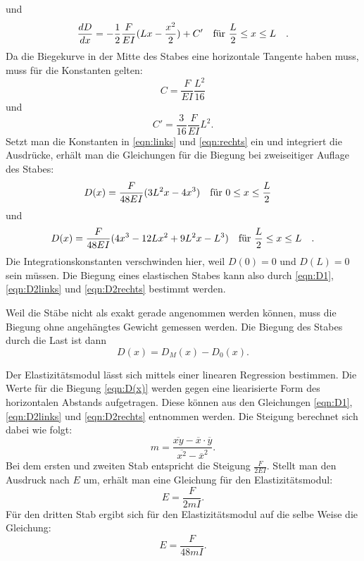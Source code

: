 und
\begin{equation*}
\frac{dD}{dx} = - \frac{1}{2} \frac{F}{EI} (Lx-\frac{x^2}{2}) + C' \qq{für $\frac{L}{2} \leq x \leq L$}.
\end{equation*}
Da die Biegekurve in der Mitte des Stabes eine horizontale Tangente
haben muss, muss für die Konstanten gelten:
\begin{equation*}
C = \frac{F}{EI} \frac{L^2}{16}
\end{equation*}
und
\begin{equation*}
C' = \frac{3}{16} \frac{F}{EI} L^2.
\end{equation*}
Setzt man die Konstanten in \eqref{eqn:links} und \eqref{eqn:rechts}
ein und integriert die Ausdrücke, erhält man die Gleichungen
für die Biegung bei zweiseitiger Auflage des Stabes:
\begin{equation}
D(x) = \frac{F}{48EI} (3L^2x - 4x^3) \qq{für $0 \leq x \leq \frac{L}{2}$}
\label{eqn:D2links}
\end{equation}
und
\begin{equation}
D(x) = \frac{F}{48EI} (4x^3 - 12Lx^2 + 9L^2x - L^3) \qq{für $\frac{L}{2} \leq x \leq L$}.
\label{eqn:D2rechts}
\end{equation}
Die Integrationskonstanten verschwinden hier, weil $D(0) = 0$ und $D(L) = 0$ sein müssen.
Die Biegung eines elastischen Stabes kann also durch
\eqref{eqn:D1}, \eqref{eqn:D2links} und \eqref{eqn:D2rechts} bestimmt werden.

\noindent Weil die Stäbe nicht als exakt gerade angenommen werden können,
muss die Biegung ohne angehängtes Gewicht gemessen werden.
Die Biegung des Stabes durch die Last ist dann 
\begin{equation}
D(x) = D_{M}(x) - D_{0}(x).
\label{eqn:D(x)}
\end{equation}

\noindent Der Elastizitätsmodul lässt sich mittels einer
linearen Regression bestimmen. Die Werte für die Biegung \eqref{eqn:D(x)}
werden gegen eine liearisierte Form des horizontalen Abstands aufgetragen.
Diese können aus den Gleichungen \eqref{eqn:D1}, \eqref{eqn:D2links} und \eqref{eqn:D2rechts} entnommen werden.
Die Steigung berechnet sich dabei wie folgt:
\begin{equation}
m = \frac{\overline{xy} - \overline{x} \cdot \overline{y}}{\overline{x^2} - \overline{x}^2}.
\label{eqn:m}
\end{equation} %
Bei dem ersten und zweiten Stab entspricht die Steigung
$\frac{F}{2EI}$.
Stellt man den Ausdruck nach $E$ um, erhält man
eine Gleichung für den Elastizitätsmodul:
\begin{equation}
E = \frac{F}{2mI}.
\label{eqn:E12}
\end{equation}
Für den dritten Stab ergibt sich für den Elastizitätsmodul auf die
selbe Weise die Gleichung:
\begin{equation}
E = \frac{F}{48mI}.
\label{eqn:E3}
\end{equation}

